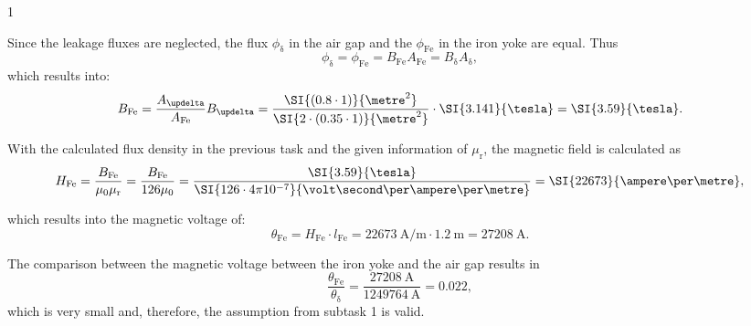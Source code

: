  {1}


\begin{solutionblock}
    Since the leakage fluxes are neglected, the flux $\phi_{\updelta}$ in the air gap and the $\phi_{\mathrm{Fe}}$ in the iron yoke are equal. Thus
    $$ \phi_{\updelta} = \phi_{\mathrm{Fe}} = B_{\mathrm{Fe}} A_{\mathrm{Fe}} = B_{\updelta} A_{\updelta},$$
    which results into:
    $$B_{\mathrm{Fe}} = \frac{A_{\updelta}}{A_{\mathrm{Fe}}} B_{\updelta} = \frac{\SI{(0.8\cdot1)}{\metre^2}}{\SI{2\cdot(0.35\cdot1)}{\metre^2}} \cdot \SI{3.141}{\tesla} = \SI{3.59}{\tesla}.$$

\end{solutionblock}





\begin{solutionblock}
    With the calculated flux density in the previous task and the given information of $\mu_{\mathrm{r}}$, the magnetic field is calculated as
    $$ H_{\mathrm{Fe}} = \frac{B_{\mathrm{Fe}}}{\mu_0 \mu_{\mathrm{r}}} = \frac{B_{\mathrm{Fe}}}{126 \mu_0} = \frac{\SI{3.59}{\tesla}}{\SI{126 \cdot 4 \pi 10^{-7}}{\volt\second\per\ampere\per\metre}} = \SI{22673}{\ampere\per\metre},$$

    which results into the magnetic voltage of:
    $$ \theta_{\mathrm{Fe}} = H_{\mathrm{Fe}} \cdot l_{\mathrm{Fe}} = \SI{22673}{\ampere\per\metre} \cdot \SI{1.2}{\metre} = \SI{27208}{\ampere}. $$

    The comparison between the magnetic voltage between the iron yoke and the air gap results in
    $$ \frac{\theta_{\mathrm{Fe}}}{\theta_{\updelta}} = \frac{\SI{27208}{\ampere}}{\SI{1249764}{\ampere}} = 0.022, $$
    which is very small and, therefore, the assumption from subtask 1 is valid.
    
\end{solutionblock}


